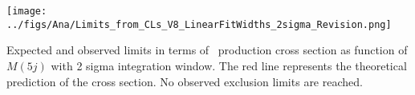 \begin{frame}{}
\vspace{-.2cm}
\begin{center}
\end{center}
  \begin{center}
    \texttt{[image: ../figs/Ana/Limits\_from\_CLs\_V8\_LinearFitWidths\_2sigma\_Revision.png]}
  \end{center}

\vspace{-.2cm}
    \begin{block}{}
      \tiny \centering Expected and observed limits in terms of \Tp~production cross section as function of $M(5j)$ with 2 sigma integration window. The red line represents the theoretical prediction of the cross section. No observed exclusion limits are reached.
    \end{block}

\end{frame}

%
%
%

